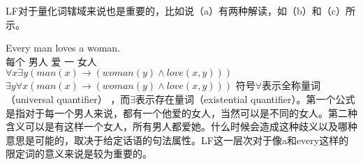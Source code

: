 LF对于量化词辖域来说也是重要的，比如说（a）有两种解读，如（b）和（c）所示。

\eal
\label{Beispiel-Every-man-loves-a-woman}
\ex 
\gll Every man loves a woman.\\
每个 男人 爱 一 女人\\
\ex $\forall x \exists y (man(x) \to (woman(y) \wedge love(x,y)))$
\ex $\exists y \forall x (man(x) \to (woman(y) \wedge love(x,y)))$
\zl
符号$\forall$\isc{$\forall$}\is{$\forall$}表示全称量词（universal quantifier） ，而$\exists$\isc{$\exists$}\is{$\exists$}表示存在量词（existential
quantifier）。第一个公式是指对于每一个男人来说，都有一个他爱的女人，当然可以是不同的女人。第二种含义可以是有这样一个女人，所有男人都爱她。什么时候会造成这种歧义以及哪种意思是可能的，取决于给定话语的句法属性。LF这一层次对于像a和every这样的限定词的意义来说是较为重要的。

